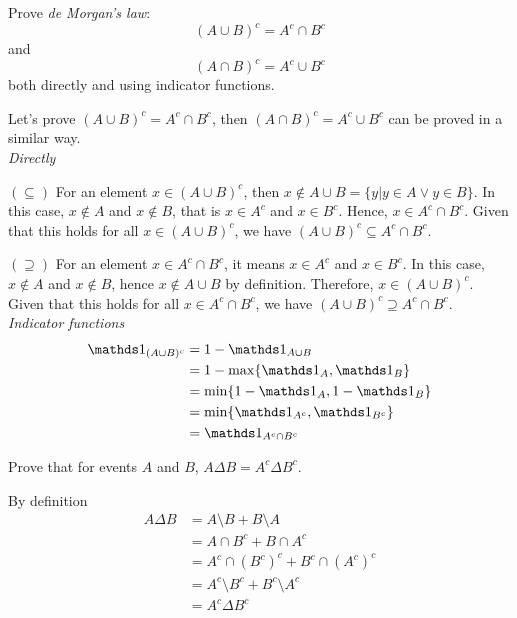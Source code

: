 \begin{exercise}
  Prove \textit{de Morgan's law}:
  \[ (A \cup B)^c = A^c \cap B^c \]
  and
  \[ (A \cap B)^c = A^c \cup B^c \]
  both directly and using indicator functions.
\end{exercise}
\begin{solution}
  Let's prove $(A\cup B)^c = A^c\cap B^c$, then $(A \cap B)^c = A^c \cup B^c$ can be proved in a similar way.\\

  \textit{Directly}

  $(\subseteq)$ For an element $x\in(A\cup B)^c$, then $x\notin A\cup B=\{ y | y\in A \vee y\in B \}$. In this case, $x\notin A$ and $x\notin B$, that is $x\in A^c$ and $x\in B^c$. Hence, $x\in A^c\cap B^c$. Given that this holds for all $x\in(A\cup B)^c$, we have $(A\cup B)^c \subseteq A^c\cap B^c$.

  $(\supseteq)$ For an element $x\in A^c\cap B^c$, it means $x\in A^c$ and $x\in B^c$. In this case, $x\notin A$ and $x\notin B$, hence $x\notin A\cup B$ by definition. Therefore, $x\in (A\cup B)^c$. Given that this holds for all $x\in A^c\cap B^c$, we have $(A\cup B)^c \supseteq A^c\cap B^c$.\\

  \textit{Indicator functions}
  \begin{align*}
  \dsone_{(A\cup B)^c} &= 1 - \dsone_{A\cup B} \\
    &= 1 - \max\{ \dsone_A, \dsone_B \} \\
    &= \min\{ 1-\dsone_A, 1-\dsone_B \} \\
    &= \min\{ \dsone _{A^c}, \dsone _{B^c} \} \\
    &= \dsone _{A^c\cap B^c}
  \end{align*}
\end{solution}


\begin{exercise}
  Prove that for events $A$ and $B$, $A\Delta B = A^c \Delta B^c$.
\end{exercise}
\begin{solution}
  By definition
  \begin{align*}
    A\Delta B &= A\setminus B + B\setminus A \\
      &= A\cap B^c + B\cap A^c \\
      &= A^c \cap (B^c)^c + B^c \cap (A^c)^c \\
      &= A^c\setminus B^c + B^c\setminus A^c \\
      &= A^c\Delta B^c
  \end{align*}
\end{solution}


